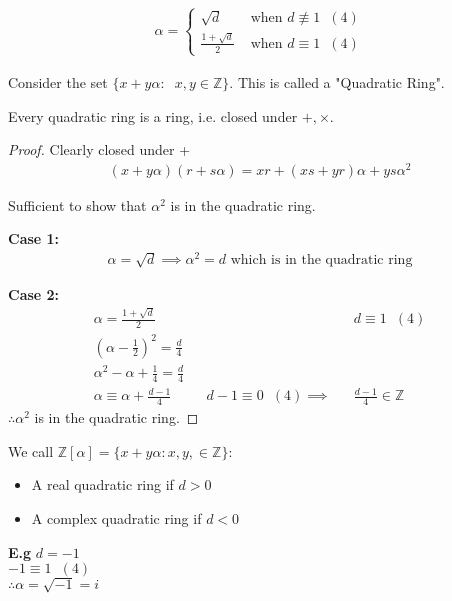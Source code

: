 \documentclass[11pt]{article}
\begin{document}
\begin{align*}
	\alpha =
	\begin{cases}
		\sqrt{d} & \text{ when }d \not \equiv 1   \hspace{7pt} (4)\\[1em]
		\frac{1+\sqrt{d}}{2} & \text{ when } d \equiv 1 \hspace{7pt} (4)
	\end{cases}
\end{align*} 

Consider the set $\{x+y\alpha : \hspace{7pt} x,y \in \mathbb{Z} \}$. This is called a "Quadratic Ring".

\begin{lemma}
Every quadratic ring is a ring, i.e. closed under $+, \times$.
\end{lemma}
\begin{proof}
Clearly closed under +
	\begin{align*}
	(x+y\alpha)(r+s\alpha) = xr + (xs+yr)\alpha + ys\alpha^2
	\end{align*}

	Sufficient to show that $\alpha^2$ is in the quadratic ring.


	\textbf{Case 1:}
	\begin{align*}
		\alpha = \sqrt{d} \implies \alpha^2 = d \text{ which is in the quadratic ring} 
	\end{align*}

	\textbf{Case 2:}
	\begin{align*}
		\alpha = \frac{1+\sqrt{d}}{2}  &&&& d \equiv 1 \hspace{7pt} (4)\\[0.5em]
		(\alpha - \frac{1}{2})^2 = \frac{d}{4}\\[0.5em]
		\alpha^2 -\alpha + \frac{1}{4} = \frac{d}{4}\\[0.5em]
		\alpha \equiv \alpha + \frac{d-1}{4} && d-1 \equiv 0 \hspace{7pt} (4) \implies && \frac{d-1}{4} \in \mathbb{Z}
	\end{align*}
	$\therefore \alpha^2 $ is in the quadratic ring.
\end{proof}

We call $\mathbb{Z}[\alpha] = \{x+y\alpha : x,y, \in \mathbb{Z}\}$:
\begin{itemize}
	\item{A real quadratic ring if $d>0$}
	\item{A complex quadratic ring if $d<0$}
\end{itemize}
\textbf{E.g} $d=-1$\\
$-1\equiv 1 \hspace{7pt} (4) $\\
$\therefore \alpha = \sqrt{-1} = i$\\[0.5em]
\end{document}
